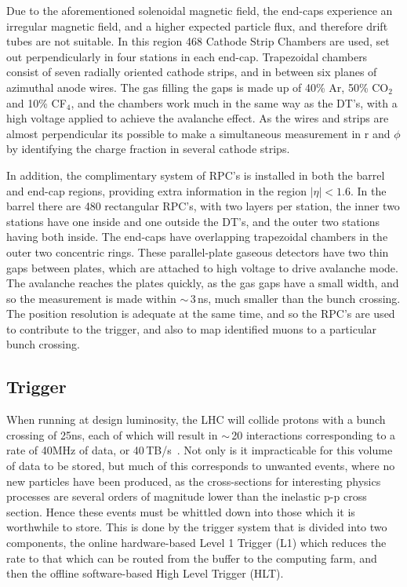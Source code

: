 Due to the aforementioned solenoidal magnetic field, the end-caps experience an irregular magnetic field, and a higher expected particle flux, and therefore drift tubes are not suitable. In this region 468 Cathode Strip Chambers are used, set out perpendicularly in four stations in each end-cap. Trapezoidal chambers consist of seven radially oriented cathode strips, and in between six planes of azimuthal anode wires. The gas filling the gaps is made up of 40\% Ar, 50\% CO$_{2}$ and 10\% CF$_{4}$, and the chambers work much in the same way as the DT's, with a high voltage applied to achieve the avalanche effect. As the wires and strips are almost perpendicular its possible to make a simultaneous measurement in r and $\phi$ by identifying the charge fraction in several cathode strips. 

In addition, the complimentary system of RPC's is installed in both the barrel and end-cap regions, providing extra information in the region $|\eta| < 1.6$. In the barrel there are 480 rectangular RPC's, with two layers per station, the inner two stations have one inside and one outside the DT's, and the outer two stations having both inside. The end-caps have overlapping trapezoidal chambers in the outer two concentric rings. These parallel-plate gaseous detectors have two thin gaps between plates, which are attached to high voltage to drive avalanche mode. The avalanche reaches the plates quickly, as the gas gaps have a small width, and so the measurement is made within $\sim$\,3\,ns, much smaller than the bunch crossing. The position resolution is adequate at the same time, and so the RPC's are used to contribute to the trigger, and also to map identified muons to a particular bunch crossing.

\subsection{Trigger}
\label{sec:detrig}
When running at design luminosity, the LHC will collide protons with a bunch crossing of 25ns, each of which will result in $\sim$\,20 interactions corresponding to a rate of 40MHz of data, or 40\,TB/s~\cite{TRIGTDR}. Not only is it impracticable for this volume of data to be stored, but much of this corresponds to unwanted events, where no new particles have been produced, as the cross-sections for interesting physics processes are several orders of magnitude lower than the inelastic p-p cross section. Hence these events must be whittled down into those which it is worthwhile to store. This is done by the trigger system that is divided into two components, the online hardware-based Level 1 Trigger (L1) which reduces the rate to that which can be routed from the buffer to the computing farm, and then the offline software-based High Level Trigger (HLT). 

